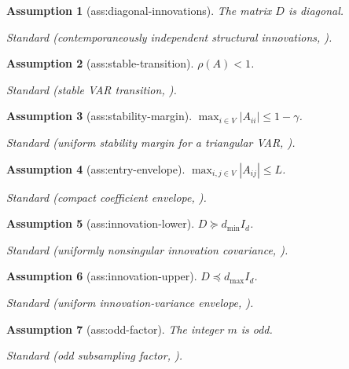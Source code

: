 \documentclass{article}
\newtheorem{assumption}{Assumption}
\begin{document}
\begin{assumption}[ass:diagonal-innovations]\label{ass:diagonal-innovations}
The matrix \(D\) is diagonal.
\par\smallskip\noindent\emph{Standard} (contemporaneously independent structural innovations, \cite{gong2015discovering}).
\end{assumption}

\begin{assumption}[ass:stable-transition]\label{ass:stable-transition}
\(\rho(A)<1\).
\par\smallskip\noindent\emph{Standard} (stable VAR transition, \cite{gong2015discovering}).
\end{assumption}

\begin{assumption}[ass:stability-margin]\label{ass:stability-margin}
\(\max_{i\in V}|A_{ii}|\le1-\gamma\).
\par\smallskip\noindent\emph{Standard} (uniform stability margin for a triangular VAR, \cite{basu2015regularized}).
\end{assumption}

\begin{assumption}[ass:entry-envelope]\label{ass:entry-envelope}
\(\max_{i,j\in V}|A_{ij}|\le L\).
\par\smallskip\noindent\emph{Standard} (compact coefficient envelope, \cite{basu2015regularized}).
\end{assumption}

\begin{assumption}[ass:innovation-lower]\label{ass:innovation-lower}
\(D\succeq d_{\min}I_d\).
\par\smallskip\noindent\emph{Standard} (uniformly nonsingular innovation covariance, \cite{basu2015regularized}).
\end{assumption}

\begin{assumption}[ass:innovation-upper]\label{ass:innovation-upper}
\(D\preceq d_{\max}I_d\).
\par\smallskip\noindent\emph{Standard} (uniform innovation-variance envelope, \cite{basu2015regularized}).
\end{assumption}

\begin{assumption}[ass:odd-factor]\label{ass:odd-factor}
The integer \(m\) is odd.
\par\smallskip\noindent\emph{Standard} (odd subsampling factor, \cite{gong2015discovering}).
\end{assumption}
\end{document}
